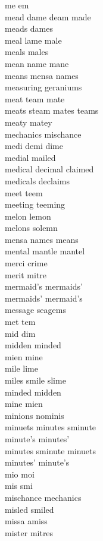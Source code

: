 me em\\
mead dame deam made\\
meads dames\\
meal lame male\\
meals males\\
mean name mane\\
means mensa names\\
measuring geraniums\\
meat team mate\\
meats steam mates teams\\
meaty matey\\
mechanics mischance\\
medi demi dime\\
medial mailed\\
medical decimal claimed\\
medicals declaims\\
meet teem\\
meeting teeming\\
melon lemon\\
melons solemn\\
mensa names means\\
mental mantle mantel\\
merci crime\\
merit mitre\\
mermaid's mermaids'\\
mermaids' mermaid's\\
message seagems\\
met tem\\
mid dim\\
midden minded\\
mien mine\\
mile lime\\
miles smile slime\\
minded midden\\
mine mien\\
minions nominis\\
minuets minutes sminute\\
minute's minutes'\\
minutes sminute minuets\\
minutes' minute's\\
mio moi\\
mis smi\\
mischance mechanics\\
misled smiled\\
missa amiss\\
mister mitres\\
